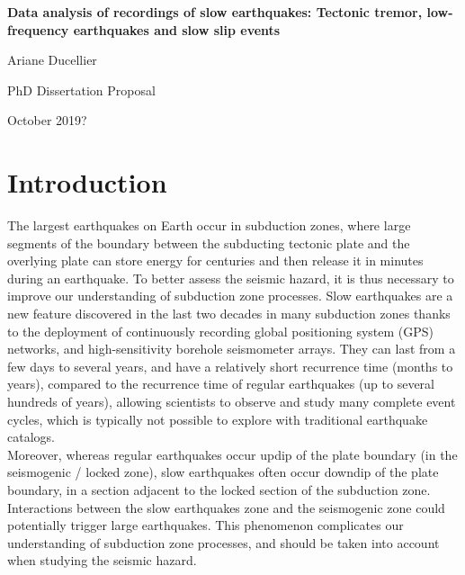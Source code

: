 \documentclass[letterpaper, 12pt]{article}
\begin{document}
\setcounter{page}{1}

\begin{center}

\textbf{Data analysis of recordings of slow earthquakes: Tectonic tremor, low-frequency earthquakes and slow slip events}

\vspace{1em}

Ariane Ducellier

PhD Dissertation Proposal

October 2019?

\end{center}

\section{Introduction}

The largest earthquakes on Earth occur in subduction zones, where large segments of the boundary between the subducting tectonic plate and the overlying plate can store energy for centuries and then release it in minutes during an earthquake. To better assess the seismic hazard, it is thus necessary to improve our understanding of subduction zone processes. Slow earthquakes are a new feature discovered in the last two decades in many subduction zones thanks to the deployment of continuously recording global positioning system (GPS) networks, and high-sensitivity borehole seismometer arrays. They can last from a few days to several years, and have a relatively short recurrence time (months to years), compared to the recurrence time of regular earthquakes (up to several hundreds of years), allowing scientists to observe and study many complete event cycles, which is typically not possible to explore with traditional earthquake catalogs. \\

Moreover, whereas regular earthquakes occur updip of the plate boundary (in the seismogenic / locked zone), slow earthquakes often occur downdip of the plate boundary, in a section adjacent to the locked section of the subduction zone. Interactions between the slow earthquakes zone and the seismogenic zone could potentially trigger large earthquakes. This phenomenon complicates our understanding of subduction zone processes, and should be taken into account when studying the seismic hazard. \\
\end{document}
